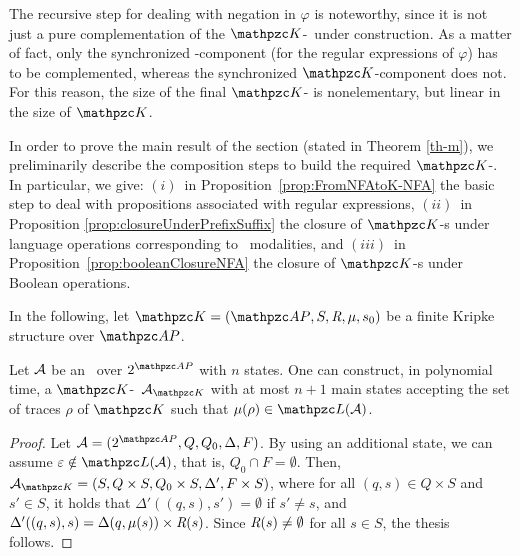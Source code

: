 The recursive step for dealing with negation in 
$\varphi$ is noteworthy, since it is not just a pure complementation of the  $\Ku$-\NFA\ under construction. As a matter of fact, only the synchronized \NFA-component (for the regular expressions of $\varphi$) has to be complemented, whereas the synchronized $\Ku$-component does not. For this reason, the size of the final $\Ku$-\NFA{} is nonelementary, but linear in the size of $\Ku$.

% 

In order to prove the main result of the section (stated in Theorem \ref{th-m}), we preliminarily 
describe the composition steps to build the required $\Ku$-\NFA. In particular, we give: $(i)$~in Proposition~\ref{prop:FromNFAtoK-NFA} the basic step to deal with propositions associated with regular expressions, $(ii)$~in Proposition \ref{prop:closureUnderPrefixSuffix} the closure of $\Ku$-\NFA s under language operations corresponding to \HS\ modalities, and $(iii)$~in Proposition~\ref{prop:booleanClosureNFA} the closure of $\Ku$-\NFA s  under Boolean operations.

In the following, let $\Ku=\KuDef$ be a finite Kripke structure over $\Prop$.

\begin{proposition}\label{prop:FromNFAtoK-NFA} Let $\mathcal{A}$ be an \NFA\ over $2^{\Prop}$ with $n$ states. One can construct, in polynomial time, a $\Ku$-\NFA\  $\Au_{\Ku}$ with at most $n+1$ main states accepting the set of traces $\rho$ of $\Ku$ such that $\mu(\rho)\in \Lang(\Au)$.
\end{proposition}
\begin{proof}
Let $\Au = \tpl{2^{\Prop},Q,Q_0,\Delta,F}$. By using an additional state, we can assume $\varepsilon\notin \Lang(\Au)$, that is, $Q_0\cap F=\emptyset$. Then, $\Au_{\Ku}=\tpl{S,Q\times S,Q_0\times S,\Delta',F\times S}$, where for all $(q,s)\in Q\times S$ and $s'\in S$, it holds that $\Delta'((q,s),s')=\emptyset$ if $s'\neq s$, and $\Delta'((q,s),s) = \Delta(q,\mu(s))\times \textit{R}(s)$. Since $\textit{R}(s)\neq \emptyset$ for all $s \in S$, the thesis follows.
\end{proof}

